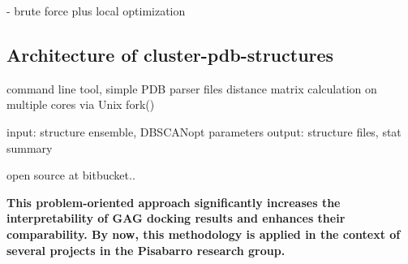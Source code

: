         - brute force plus local optimization

\subsection{Architecture of cluster-pdb-structures}

            command line tool, simple PDB parser files
            distance matrix calculation on multiple cores via Unix fork()

            input: structure ensemble, DBSCANopt parameters
            output: structure files, stat summary


            open source at bitbucket..


\textbf{
This problem-oriented approach significantly increases the
interpretability of GAG docking results and enhances their comparability. By
now, this methodology is applied in the context of several projects in the
Pisabarro research group.
}



